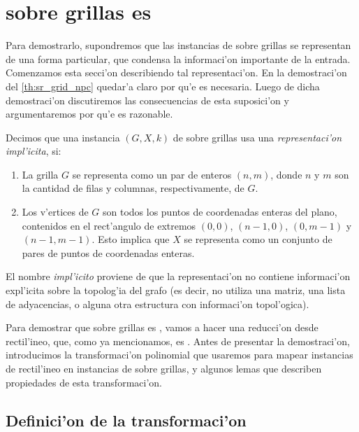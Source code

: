 \section{ sobre grillas es }

\label{se:sr_grid_npc}

Para demostrarlo, supondremos que las instancias de  sobre grillas se representan de una forma particular, que condensa la informaci'on importante de la entrada. Comenzamos esta secci'on describiendo tal representaci'on. En la demostraci'on del \autoref{th:sr_grid_npc} quedar'a claro por qu'e es necesaria. Luego de dicha demostraci'on discutiremos las consecuencias de esta suposici'on y argumentaremos por qu'e es razonable.

\begin{definition}
\label{de:representacion_implicita}
Decimos que una instancia $(G, X, k)$ de  sobre grillas usa una \textit{representaci'on impl'icita}, si:

\begin{enumerate}
\item La grilla $G$ se representa como un par de enteros $(n, m)$, donde $n$ y $m$ son la cantidad de filas y columnas, respectivamente, de $G$.
\item Los v'ertices de $G$ son todos los puntos de coordenadas enteras del plano, contenidos en el rect'angulo de extremos $(0, 0)$, $(n - 1, 0)$, $(0, m - 1)$ y $(n - 1, m - 1)$. Esto implica que $X$ se representa como un conjunto de pares de puntos de coordenadas enteras.
\end{enumerate}
\end{definition}

El nombre \textit{impl'icito} proviene de que la representaci'on no contiene informaci'on expl'icita sobre la topolog'ia del grafo (es decir, no utiliza una matriz, una lista de adyacencias, o alguna otra estructura con informaci'on topol'ogica).

Para demostrar que  sobre grillas es , vamos a hacer una reducci'on desde  rectil'ineo, que, como ya mencionamos, es . Antes de presentar la demostraci'on, introducimos la transformaci'on polinomial que usaremos para mapear instancias de  rectil'ineo en instancias de  sobre grillas, y algunos lemas que describen propiedades de esta transformaci'on.

\subsection{Definici'on de la transformaci'on}

